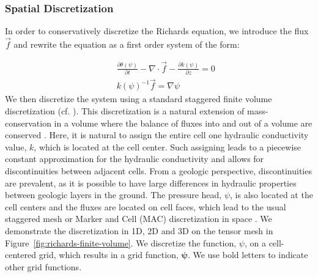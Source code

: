 \documentclass[preprint,review,3p,times,onecolumn,authoryear]{elsarticle}
\newcommand{\bfpsi}{\boldsymbol{\psi}}
\begin{document}
\subsubsection{Spatial Discretization}

In order to conservatively discretize the Richards equation, we introduce the flux ${\vec f}$ and rewrite the equation as a first order system of the form:


\begin{subequations}
\label{eq:richards-mixed-first-order}
\begin{eqnarray}
\label{eq:richards-mixed-first-order-a}
&&    \frac{\partial \theta(\psi)}{\partial t} - \nabla \cdot {\vec f} - \frac{\partial k(\psi)}{\partial z} = 0 \\
\label{eq:richards-mixed-first-order-b}
&&    k(\psi)^{-1} {\vec f} =  \nabla \psi
\end{eqnarray}
\end{subequations}
We then discretize the system using a standard staggered finite volume discretization (cf. \cite{Ascher2008, haber2015computational, fvtutorial}). This discretization is a natural extension of mass-conservation in a volume where the balance of fluxes into and out of a volume are conserved \citep{LipnikovMisitas2013}. Here, it is natural to assign the entire cell one hydraulic conductivity value, $k$, which is located at the cell center. Such assigning leads to a piecewise constant approximation for the hydraulic conductivity and allows for discontinuities between adjacent cells. From a geologic perspective, discontinuities are prevalent, as it is possible to have large differences in hydraulic properties between geologic layers in the ground. The pressure head, $\psi$, is also located at the cell centers and the fluxes are located on cell faces, which lead to the usual staggered mesh or Marker and Cell (MAC) discretization in space \citep{fletcher}. We demonstrate the discretization in 1D, 2D and 3D on the tensor mesh in Figure~\ref{fig:richards-finite-volume}. We discretize the function, $\psi$, on a cell-centered grid, which results in a grid function, $\bfpsi$. We use bold letters to indicate other grid functions.
\end{document}
